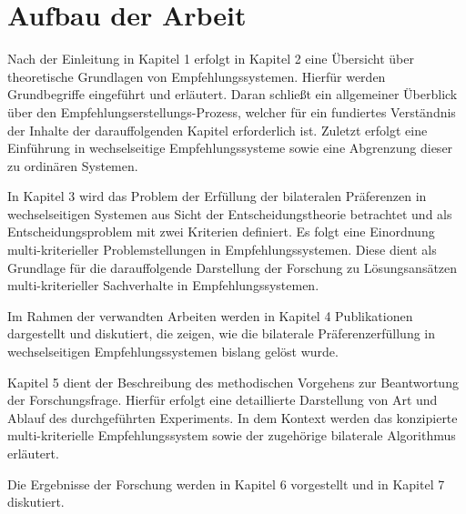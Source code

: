 \section{Aufbau der Arbeit}
\label{sec:einleitung:aufbau_der_arbeit}
Nach der Einleitung in Kapitel 1 erfolgt in Kapitel 2 eine Übersicht über theoretische Grundlagen von Empfehlungssystemen.
Hierfür werden Grundbegriffe eingeführt und erläutert.
Daran schließt ein allgemeiner Überblick über den Empfehlungserstellungs-Prozess, welcher für ein fundiertes Verständnis der Inhalte der darauffolgenden Kapitel erforderlich ist.
Zuletzt erfolgt eine Einführung in wechselseitige Empfehlungssysteme sowie eine Abgrenzung dieser zu ordinären Systemen.

In Kapitel 3 wird das Problem der Erfüllung der bilateralen Präferenzen in wechselseitigen Systemen aus Sicht der Entscheidungstheorie betrachtet und als Entscheidungsproblem mit zwei Kriterien definiert.
Es folgt eine Einordnung multi-kriterieller Problemstellungen in Empfehlungssystemen.
Diese dient als Grundlage für die darauffolgende Darstellung der Forschung zu Lösungsansätzen multi-kriterieller Sachverhalte in Empfehlungssystemen.

Im Rahmen der verwandten Arbeiten werden in Kapitel 4 Publikationen dargestellt und diskutiert, die zeigen, wie die bilaterale Präferenzerfüllung in wechselseitigen Empfehlungssystemen bislang gelöst wurde.

Kapitel 5 dient der Beschreibung des methodischen Vorgehens zur Beantwortung der Forschungsfrage.
Hierfür erfolgt eine detaillierte Darstellung von Art und Ablauf des durchgeführten Experiments.
In dem Kontext werden das konzipierte multi-kriterielle Empfehlungssystem sowie der zugehörige bilaterale Algorithmus erläutert.

Die Ergebnisse der Forschung werden in Kapitel 6 vorgestellt und in Kapitel 7 diskutiert.


